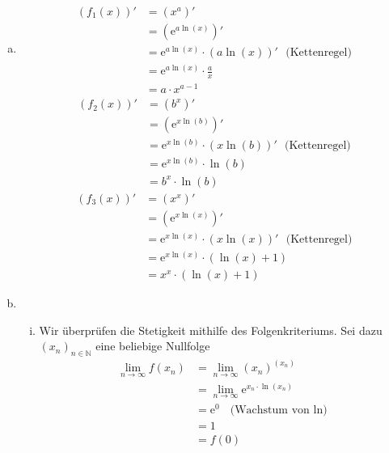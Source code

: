 \documentclass{scrreprt}
\newcommand{\NN}{\mathbb{N}}
\newcommand{\round}[1]{\left(#1\right)}
\newcommand{\euler}{\mathrm{e}}
\newcommand{\round}[1]{\left\(#1\right\)}
\begin{document}
\begin{enumerate}[(a)]
\item
    \begin{align*}
        \round{f_1\round{x}}' & = \round{x^a}'\\
        & = \round{\euler^{a \ln\round{x}}}'\\
        & = \euler^{a \ln\round{x}} \cdot \round{a \ln\round{x}}' ~~~ \text{(Kettenregel)}\\
        & = \euler^{a \ln\round{x}} \cdot \frac{a}{x}\\
        & = a \cdot x^{a-1}
    \end{align*}
    \begin{align*}
        \round{f_2\round{x}}' & = \round{b^x}'\\
        & = \round{\euler^{x \ln\round{b}}}'\\
        & = \euler^{x \ln\round{b}} \cdot \round{x \ln\round{b}}' ~~~ \text{(Kettenregel)}\\
        & = \euler^{x \ln\round{b}} \cdot \ln\round{b}\\
        & = b^x \cdot \ln\round{b}
    \end{align*}
    \begin{align*}
        \round{f_3\round{x}}' & = \round{x^x}'\\
        & = \round{\euler^{x \ln\round{x}}}'\\
        & = \euler^{x \ln\round{x}} \cdot \round{x \ln\round{x}}' ~~~ \text{(Kettenregel)}\\
        & = \euler^{x \ln\round{x}} \cdot \round{\ln\round{x} + 1}\\
        & = x^x \cdot \round{\ln\round{x} + 1}
    \end{align*}
\item
    \begin{enumerate}[(i)]
    \item
        Wir überprüfen die Stetigkeit mithilfe des Folgenkriteriums. Sei dazu $(x_n)_{n \in \NN}$ eine beliebige Nullfolge
        \begin{align*}
            \lim\limits_{n \to \infty} f(x_n) & = \lim\limits_{n \to \infty} \round{x_n}^{\round{x_n}}\\
            & = \lim\limits_{n \to \infty} \euler^{x_n \cdot \ln\round{x_n}}\\
            & = \euler^0 ~~~ \text{(Wachstum von $\ln$)}\\
            & = 1\\
            & = f(0)
        \end{align*}

\end{enumerate}
\end{enumerate}
\end{document}
